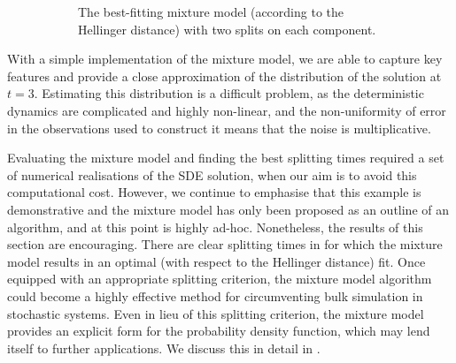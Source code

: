\begin{figure}
\begin{center}
\begin{subfigure}{\textwidth}
			\caption{The best-fitting mixture model (according to the Hellinger distance) with two splits on each component.}
			\label{fig:na_2split_best}
		\end{subfigure}
		\caption{}
		\label{fig:na_2split}
	\end{center}
\end{figure}


With a simple implementation of the mixture model, we are able to capture key features and provide a close approximation of the distribution of the solution at \(t = 3\).
Estimating this distribution is a difficult problem, as the deterministic dynamics are complicated and highly non-linear, and the non-uniformity of error in the observations used to construct it means that the noise is multiplicative.

Evaluating the mixture model and finding the best splitting times required a set of numerical realisations of the SDE solution, when our aim is to avoid this computational cost.
However, we continue to emphasise that this example is demonstrative and the mixture model has only been proposed as an outline of an algorithm, and at this point is highly ad-hoc.
Nonetheless, the results of this section are encouraging.
There are clear splitting times in  for which the mixture model results in an optimal (with respect to the Hellinger distance) fit.
Once equipped with an appropriate splitting criterion, the mixture model algorithm could become a highly effective method for circumventing bulk simulation in stochastic systems.
Even in lieu of this splitting criterion, the mixture model provides an explicit form for the probability density function, which may lend itself to further applications.
We discuss this in detail in .





